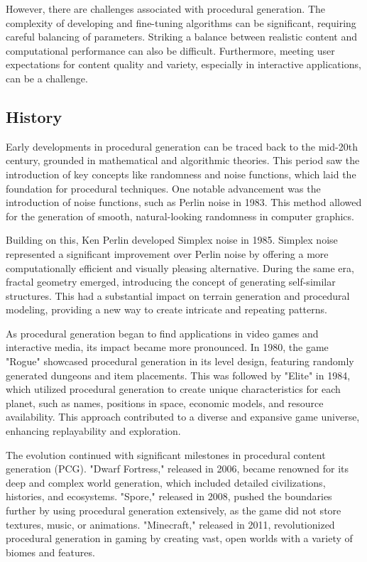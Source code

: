 However, there are challenges associated with procedural generation. The complexity of developing and fine-tuning algorithms can be significant, requiring careful balancing of parameters. Striking a balance between realistic content and computational performance can also be difficult. Furthermore, meeting user expectations for content quality and variety, especially in interactive applications, can be a challenge.

\subsection{History}
Early developments in procedural generation can be traced back to the mid-20th century, grounded in mathematical and algorithmic theories. This period saw the introduction of key concepts like randomness and noise functions, which laid the foundation for procedural techniques. One notable advancement was the introduction of noise functions, such as Perlin noise in 1983. This method allowed for the generation of smooth, natural-looking randomness in computer graphics.

Building on this, Ken Perlin developed Simplex noise in 1985. Simplex noise represented a significant improvement over Perlin noise by offering a more computationally efficient and visually pleasing alternative. During the same era, fractal geometry emerged, introducing the concept of generating self-similar structures. This had a substantial impact on terrain generation and procedural modeling, providing a new way to create intricate and repeating patterns.

As procedural generation began to find applications in video games and interactive media, its impact became more pronounced. In 1980, the game "Rogue" showcased procedural generation in its level design, featuring randomly generated dungeons and item placements. This was followed by "Elite" in 1984, which utilized procedural generation to create unique characteristics for each planet, such as names, positions in space, economic models, and resource availability. This approach contributed to a diverse and expansive game universe, enhancing replayability and exploration.

The evolution continued with significant milestones in procedural content generation (PCG). "Dwarf Fortress," released in 2006, became renowned for its deep and complex world generation, which included detailed civilizations, histories, and ecosystems. "Spore," released in 2008, pushed the boundaries further by using procedural generation extensively, as the game did not store textures, music, or animations. "Minecraft," released in 2011, revolutionized procedural generation in gaming by creating vast, open worlds with a variety of biomes and features.


